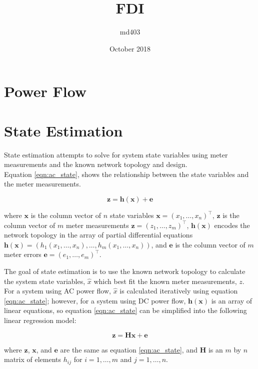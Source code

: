 \documentclass{article}
\title{FDI}
\author{md403}
\date{October 2018}
\begin{document}
\section{Power Flow}

\section{State Estimation}

State estimation attempts to solve for system state variables using meter measurements and the known network topology and design.  \\

Equation \eqref{eqn:ac_state}, shows the relationship between the state variables and the meter measurements.

\begin{equation}\label{eqn:ac_state}
    \mathbf{z = h(x) + e}
\end{equation}

where $\mathbf{x}$ is the column vector of $n$ state variables $\mathbf{x} = (x_1, \ldots, x_n)^\top$,
$\mathbf{z}$ is the column vector of $m$ meter measurements $\mathbf{z} = (z_1, \ldots, z_m)^\top$,
$\mathbf{h(x)}$ encodes the network topology in the array of partial differential equations $\mathbf{h(x)} = (h_1(x_1, \ldots, x_n), \ldots, h_m(x_1, \ldots, x_n))$, and
$\mathbf{e}$ is the column vector of $m$ meter errors $\mathbf{e} = (e_1, \ldots, e_m)^\top$.

The goal of state estimation is to use the known network topology to calculate the system state variables, $\hat{x}$ which best fit the known meter measurements, $z$. \\

For a system using AC power flow, $\hat{x}$ is calculated iteratively using equation \eqref{eqn:ac_state}; however, for a system using DC power flow, $\mathbf{h(x)}$ is an array of linear equations, so equation \eqref{eqn:ac_state} can be simplified into the following linear regression model:

\begin{equation}\label{eqn:dc_state}
    \mathbf{z = Hx + e}
\end{equation}

where $\mathbf{z}$, $\mathbf{x}$, and $\mathbf{e}$ are the same as equation \eqref{eqn:ac_state}, and
$\mathbf{H}$ is an $m$ by $n$ matrix of elements $h_{ij}$ for $i = 1, \ldots, m$ and $j = 1, \ldots, n$.
\end{document}
